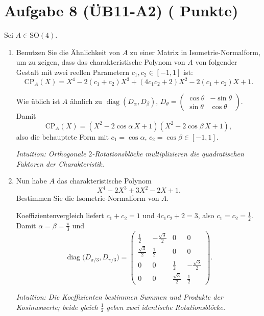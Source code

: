\documentclass[11pt, a4paper]{article}
\newcommand{\aufgabe}[2]{%
  \section*{\Large\bfseries Aufgabe #1%
  \if\relax\detokenize{#2}\relax\else \hfill\normalfont\normalsize(#2 Punkte)\fi}%
  \vspace{-1.5ex}
}
\begin{document}
\aufgabe{8 (ÜB11-A2)}{}
Sei $A\in \mathrm{SO}(4)$.
\begin{enumerate}
  \item Benutzen Sie die Ähnlichkeit von $A$ zu einer Matrix in Isometrie-Normalform, um zu zeigen, dass das charakteristische Polynom von $A$ von folgender Gestalt mit zwei reellen Parametern $c_1,c_2\in[-1,1]$ ist:
  \[
    \mathrm{CP}_A(X)=X^4-2(c_1+c_2)X^3+(4c_1c_2+2)X^2-2(c_1+c_2)X+1.
  \]
  \begin{framed}
  Wie üblich ist $A$ ähnlich zu $\operatorname{diag}(D_\alpha,D_\beta)$,
  $D_\theta=\begin{pmatrix}\cos\theta&-\sin\theta\\ \sin\theta&\cos\theta\end{pmatrix}$.
  Damit
  \[
  \mathrm{CP}_A(X)=(X^2-2\cos\alpha\,X+1)(X^2-2\cos\beta\,X+1),
  \]
  also die behauptete Form mit $c_1=\cos\alpha$, $c_2=\cos\beta\in[-1,1]$.

  \medskip\noindent\textit{Intuition: Orthogonale $2$-Rotationsblöcke multiplizieren die quadratischen Faktoren der Charakteristik.}
  \end{framed}

  \item Nun habe $A$ das charakteristische Polynom
  \[
    X^4-2X^3+3X^2-2X+1.
  \]
  Bestimmen Sie die Isometrie-Normalform von $A$.
  \begin{framed}
  Koeffizientenvergleich liefert $c_1+c_2=1$ und $4c_1c_2+2=3$, also
  $c_1=c_2=\tfrac12$. Damit $\alpha=\beta=\tfrac{\pi}{3}$ und
  \[
  \operatorname{diag}\!\big(D_{\pi/3},D_{\pi/3}\big)
  =
  \begin{pmatrix}
  \tfrac12&-\tfrac{\sqrt3}{2}&0&0\\[2pt]
  \tfrac{\sqrt3}{2}&\tfrac12&0&0\\[2pt]
  0&0&\tfrac12&-\tfrac{\sqrt3}{2}\\[2pt]
  0&0&\tfrac{\sqrt3}{2}&\tfrac12
  \end{pmatrix}.
  \]

  \medskip\noindent\textit{Intuition: Die Koeffizienten bestimmen Summen und Produkte der Kosinuswerte; beide gleich $\tfrac12$ geben zwei identische Rotationsblöcke.}
  \end{framed}
\end{enumerate}
\end{document}
